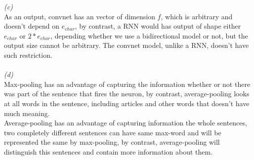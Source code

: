 \documentclass{article}
\begin{document}
\textit{(c)} \\
\hspace*{0.2cm} As an output, convnet has an vector of dimension $f$, which is arbitrary and doesn't depend on $e_{char}$, by contrast, a RNN would has output of shape either $e_{char}$ or $2 * e_{char}$, depending whether we use a bidirectional model or not, but the output size cannot be arbitrary. The convnet model, unlike a RNN, doesn't have such restriction.\\ \\
\textit{(d)} \\
\hspace*{0.2cm} Max-pooling has an advantage of capturing the information whether or not there was part of the sentence that fires the neuron, by contrast, average-pooling looks at all words in the sentence, including articles and other words that doesn't have much meaning. \\
\hspace*{0.2cm} Average-pooling has an advantage of capturing information the whole sentences, two completely different sentences can have same max-word and will be represented the same by max-pooling, by contrast, average-pooling will distinguish this sentences and contain more information about them.\\

\hspace*{0.4cm}
\end{document}
